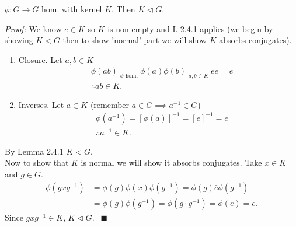 \begin{lemma}
$\phi:G\rightarrow \bar{G}$ hom. with kernel $K$. Then $K\triangleleft G$. \steezybreak

\noindent \textit{Proof:} We know $e\in K$ so $K$ is non-empty and L 2.4.1 applies (we begin by
showing $K<G$ then to show 'normal' part we will show $K$ absorbs conjugates).
\begin{enumerate}[label=\roman*)]
    \item Closure. Let $a,b\in K$
    \begin{align}
        &\phi(ab)\underset{\phi \text{ hom.}}{=}\phi(a)\phi(b)\underset{a,b\in K}{=} \bar{e}\bar{e}=\bar{e} \nonumber \\
        &\therefore ab\in K. \nonumber
    \end{align}
    \item Inverses. Let $a\in K$  (remember $a\in G \implies a^{-1}\in G$)
    \begin{align}
        &\phi(a^{-1})=[\phi(a)]^{-1}=[\bar{e}]^{-1}=\bar{e}\nonumber \\
        &\therefore a^{-1}\in K. \nonumber
    \end{align}
\end{enumerate}
By Lemma 2.4.1 $K<G$. \\
Now to show that $K$ is normal we will show it absorbs conjugates. Take $x\in K$ and $g\in G$.
\begin{align}
    \phi(gxg^{-1})&= \phi(g)\phi(x)\phi(g^{-1}) = \phi(g)\bar{e}\phi(g^{-1})\nonumber \\
    &= \phi(g)\phi(g^{-1})=\phi(g\cdot g^{-1})= \phi(e)=\bar{e}. \nonumber
\end{align}
Since $gxg^{-1}\in K$, $K\triangleleft G$. $\ \ \blacksquare$
\end{lemma}

